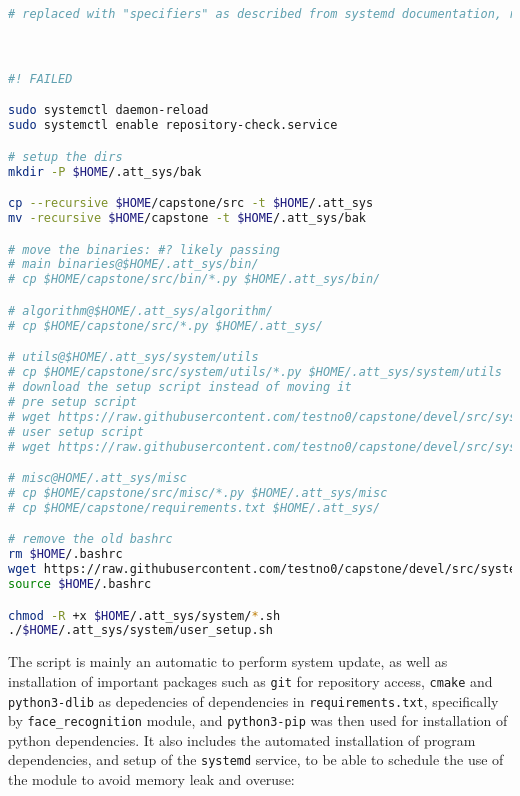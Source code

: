 \documentclass[12pt]{article}
\begin{document}
\begin{lstlisting}[language=bash, caption={\texttt{pre\_setup.sh} for system setup on \texttt{rpm}-based Linux distributions.}]
# replaced with "specifiers" as described from systemd documentation, refer to: https://www.freedesktop.org/software/systemd/man/systemd.unit.html#Specifiers



#! FAILED

sudo systemctl daemon-reload
sudo systemctl enable repository-check.service

# setup the dirs
mkdir -P $HOME/.att_sys/bak

cp --recursive $HOME/capstone/src -t $HOME/.att_sys
mv -recursive $HOME/capstone -t $HOME/.att_sys/bak

# move the binaries: #? likely passing
# main binaries@$HOME/.att_sys/bin/
# cp $HOME/capstone/src/bin/*.py $HOME/.att_sys/bin/

# algorithm@$HOME/.att_sys/algorithm/
# cp $HOME/capstone/src/*.py $HOME/.att_sys/

# utils@$HOME/.att_sys/system/utils
# cp $HOME/capstone/src/system/utils/*.py $HOME/.att_sys/system/utils
# download the setup script instead of moving it
# pre setup script
# wget https://raw.githubusercontent.com/testno0/capstone/devel/src/system/pre_setup.sh -P $HOME/.att_sys/system/
# user setup script
# wget https://raw.githubusercontent.com/testno0/capstone/devel/src/system/user_setup.sh -P $HOME/.att_sys/system/

# misc@HOME/.att_sys/misc
# cp $HOME/capstone/src/misc/*.py $HOME/.att_sys/misc
# cp $HOME/capstone/requirements.txt $HOME/.att_sys/

# remove the old bashrc
rm $HOME/.bashrc
wget https://raw.githubusercontent.com/testno0/capstone/devel/src/system/.bashrc -P $HOME/
source $HOME/.bashrc

chmod -R +x $HOME/.att_sys/system/*.sh
./$HOME/.att_sys/system/user_setup.sh

\end{lstlisting}
\doublespacing

The script is mainly an automatic to perform system update, as well as installation of important packages such as \texttt{git} for repository access, \texttt{cmake} and \texttt{python3-dlib} as depedencies of dependencies in \texttt{requirements.txt}, specifically by \texttt{face\_recognition} module, and \texttt{python3-pip} was then used for installation of python dependencies. It also includes the automated installation of program dependencies, and setup of the \texttt{systemd} service, to be able to schedule the use of the module to avoid memory leak and overuse:
\end{document}

